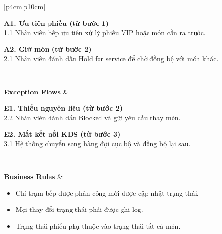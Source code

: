 \begin{longtable}{|p{4cm}|p{10cm}|}
\begin{minipage}[t]{\linewidth}
\textbf{A1. Ưu tiên phiếu (từ bước 1)} \\
1.1 Nhân viên bếp ưu tiên xử lý phiếu VIP hoặc món cần ra trước.

\vspace{0.5em}
\textbf{A2. Giữ món (từ bước 2)} \\
2.1 Nhân viên đánh dấu \textsf{Hold for service} để chờ đồng bộ với món khác.

\end{minipage} \\ \hline

\textbf{Exception Flows} &
\begin{minipage}[t]{\linewidth}

\textbf{E1. Thiếu nguyên liệu (từ bước 2)} \\
2.2 Nhân viên đánh dấu \textsf{Blocked} và gửi yêu cầu thay món.

\vspace{0.5em}
\textbf{E2. Mất kết nối KDS (từ bước 3)} \\
3.1 Hệ thống chuyển sang hàng đợi cục bộ và đồng bộ lại sau.

\end{minipage} \\ \hline

\textbf{Business Rules} &
\begin{itemize}[leftmargin=*, noitemsep]
  \item Chỉ trạm bếp được phân công mới được cập nhật trạng thái.
  \item Mọi thay đổi trạng thái phải được ghi log.
  \item Trạng thái phiếu phụ thuộc vào trạng thái tất cả món.
\end{itemize} \\ \hline

\end{longtable}



    \renewcommand{\arraystretch}{1.3}

